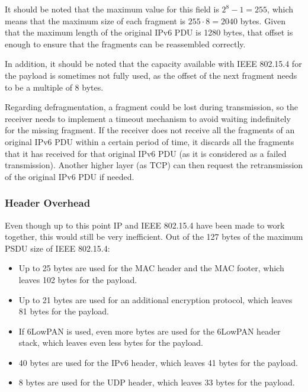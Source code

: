 \begin{itemize}
\begin{itemize}
        It should be noted that the maximum value for this field is $2^8-1=255$, which means that the maximum size of each fragment is $255 \cdot 8 = 2040$ bytes. Given that the maximum length of the original IPv6 PDU is 1280 bytes, that offset is enough to ensure that the fragments can be reassembled correctly.

        In addition, it should be noted that the capacity available with IEEE 802.15.4 for the payload is sometimes not fully used, as the offset of the next fragment needs to be a multiple of 8 bytes.
    \end{itemize}
\end{itemize}

Regarding defragmentation, a fragment could be lost during transmission, so the receiver needs to implement a timeout mechanism to avoid waiting indefinitely for the missing fragment. If the receiver does not receive all the fragments of an original IPv6 PDU within a certain period of time, it discards all the fragments that it has received for that original IPv6 PDU (as it is considered as a failed transmission). Another higher layer (as TCP) can then request the retransmission of the original IPv6 PDU if needed.

\subsubsection{Header Overhead}

Even though up to this point IP and IEEE 802.15.4 have been made to work together, this would still be very inefficient. Out of the 127 bytes of the maximum PSDU size of IEEE 802.15.4:
\begin{itemize}
    \item Up to 25 bytes are used for the MAC header and the MAC footer, which leaves 102 bytes for the payload.
    \item Up to 21 bytes are used for an additional encryption protocol, which leaves 81 bytes for the payload.
    \item If 6LowPAN is used, even more bytes are used for the 6LowPAN header stack, which leaves even less bytes for the payload.
    \item 40 bytes are used for the IPv6 header, which leaves 41 bytes for the payload.
    \item 8 bytes are used for the UDP header, which leaves 33 bytes for the payload.
\end{itemize}

